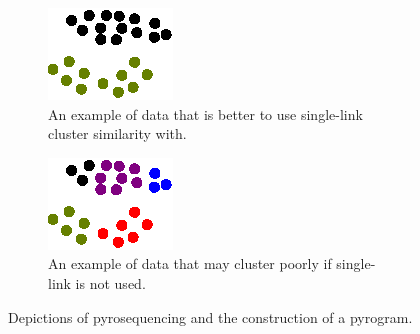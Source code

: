 \documentclass[12pt]{ucthesis}
\begin{document}
         \begin{figure}[t]
            \centering
            \begin{subfigure}[t]{0.45\textwidth}
               \centering
               \includegraphics[width=\textwidth]{graphics/good_single_link.eps}
               \caption{An example of data that is better to use single-link
                        cluster similarity with.}
               \label{fig:good_single_link}
            \end{subfigure}
            \hfill
            \begin{subfigure}[t]{0.45\textwidth}
               \centering
               \includegraphics[width=\textwidth]{graphics/bad_single_link.eps}
               \caption{An example of data that may cluster poorly if single-link
                        is not used.}
               \label{fig:bad_single_link}
            \end{subfigure}
            \caption{Depictions of pyrosequencing and the construction of a
                     pyrogram.}
            \label{fig:single_link}
         \end{figure}
\end{document}
